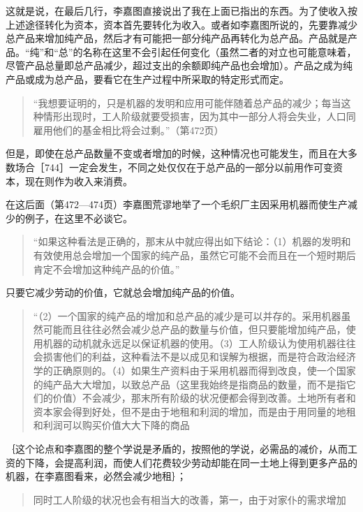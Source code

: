 这就是说，在最后几行，李嘉图直接说出了我在上面已指出的东西。为了使收入按上述途径转化为资本，资本首先要转化为收入。或者如李嘉图所说的，先要靠减少总产品来增加纯产品，然后才有可能把一部分纯产品再转化为总产品。产品就是产品。“纯”和“总”的名称在这里不会引起任何变化（虽然二者的对立也可能意味着，尽管产品总量即总产品减少，超过支出的余额即纯产品也会增加）。产品之成为纯产品或成为总产品，要看它在生产过程中所采取的特定形式而定。

\begin{quote}{“我想要证明的，只是机器的发明和应用可能伴随着总产品的减少；每当这种情形出现时，工人阶级就要受损害，因为其中一部分人将会失业，人口同雇用他们的基金相比将会过剩。”（第472页）}\end{quote}

但是，即使在总产品数量不变或者增加的时候，这种情况也可能发生，而且在大多数场合［744］一定会发生，不同之处仅仅在于总产品的一部分以前用作可变资本，现在则作为收入来消费。

在这后面（第472—474页）李嘉图荒谬地举了一个毛织厂主因采用机器而使生产减少的例子，在这里不必谈它。

\begin{quote}{“如果这种看法是正确的，那末从中就应得出如下结论：（1）机器的发明和有效使用总会增加一个国家的纯产品，虽然它可能不会而且在一个短时期后肯定不会增加这种纯产品的价值。”}\end{quote}

只要它减少劳动的价值，它就总会增加纯产品的价值。

\begin{quote}{“（2）一个国家的纯产品的增加和总产品的减少是可以并存的。采用机器虽然可能而且往往必然会减少总产品的数量与价值，但只要能增加纯产品，使用机器的动机就永远足以保证机器的使用。（3）工人阶级认为使用机器往往会损害他们的利益，这种看法不是以成见和误解为根据，而是符合政治经济学的正确原则的。（4）如果生产资料由于采用机器而得到改良，使一个国家的纯产品大大增加，以致总产品（这里我始终是指商品的数量，而不是指它们的价值）不会减少，那末所有阶级的状况便都会得到改善。土地所有者和资本家会得到好处，但不是由于地租和利润的增加，而是由于用同量的地租和利润可以购买价值大大下降的商品}\end{quote}

｛这个论点和李嘉图的整个学说是矛盾的，按照他的学说，必需品的减价，从而工资的下降，会提高利润，而使人们花费较少劳动却能在同一土地上得到更多产品的机器，在李嘉图看来，必然会减少地租｝；

\begin{quote}{同时工人阶级的状况也会有相当大的改善，第一，由于对家仆的需求增加}\end{quote}

